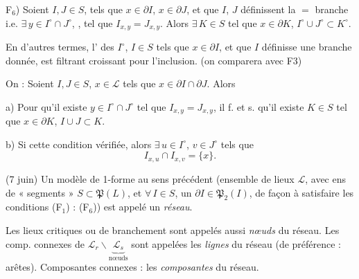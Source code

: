 \documentclass[11pt,a4paper]{article}
\begin{document}
F$_6$) Soient $I, J \in S$,  tels que $x \in \partial I$, $x \in \partial J$, et que $I$, $J$ définissent la $=$ branche i.e. $\exists\, y \in I^{\circ} \cap J^{\circ}$, , tel que $I_{x,y} = J_{x,y}$. Alors $\exists\, K \in S$ tel que $x \in \partial K$, $I^{\circ} \cup J^{\circ} \subset K^{\circ}$.

En d'autres termes, l' des $I^{\circ}$, $I \in S$ tels que $x \in \partial I$, et que $I$ définisse une branche donnée, est filtrant croissant pour l'inclusion. (on comparera avec F3)


On  : Soient $I, J \in S$, $x \in \mathcal{L}$ tels que $x \in \partial I \cap \partial J$. Alors

a) Pour qu'il existe $y \in I^{\circ} \cap J^{\circ}$ tel que $I_{x,y} = J_{x,y}$, il f. et s. qu'il existe $K \in S$ tel que $x \in \partial K$, $I \cup J \subset K$.

b) Si cette condition  vérifiée, alors $\exists\, u \in I^{\circ}$, $v \in J^{\circ}$ tels que
\[
  I_{x,u} \cap I_{x,v} = \{x\}.
\]


(7 juin) Un modèle de 1-forme au sens précédent (ensemble de lieux $\mathcal{L}$, avec ens de « segments » $S \subset \mathfrak{P}(L)$, et $\forall\, I \in S$, un $\partial I \in \mathfrak{P}_2(I)$, \struck{\ill{}} de façon à satisfaire les conditions (F$_1$) : (F$_6$)) est appelé un \emph{réseau}.

Les lieux critiques  ou de branchement sont appelés aussi \emph{nœuds} du réseau. Les comp. connexes de $\mathcal{L}_r \smallsetminus \underbrace{\mathcal{L}_s}_{\text{nœuds}}$ sont appelées les \emph{lignes} du réseau (de préférence : arêtes). Composantes connexes : les \emph{composantes} du réseau.
\end{document}

